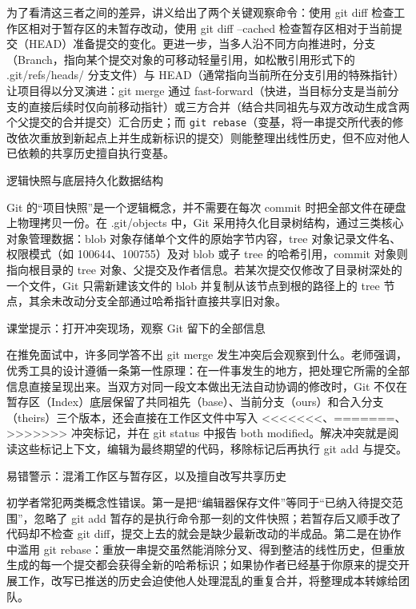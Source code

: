 \documentclass[UTF8,a4paper,11pt,fontset=fandol]{ctexart}
\begin{document}
为了看清这三者之间的差异，讲义给出了两个关键观察命令：使用 git diff 检查工作区相对于暂存区的未暂存改动，使用 git diff --cached 检查暂存区相对于当前提交（HEAD）准备提交的变化。更进一步，当多人沿不同方向推进时，分支（Branch，指向某个提交对象的可移动轻量引用，如松散引用形式下的 .git/refs/heads/ 分支文件）与 HEAD（通常指向当前所在分支引用的特殊指针）让项目得以分叉演进：git merge 通过 fast-forward（快进，当目标分支是当前分支的直接后续时仅向前移动指针）或三方合并（结合共同祖先与双方改动生成含两个父提交的合并提交）汇合历史；而 \texttt{git rebase}（变基，将一串提交所代表的修改依次重放到新起点上并生成新标识的提交）则能整理出线性历史，但不应对他人已依赖的共享历史擅自执行变基。

\begin{importantbox}{逻辑快照与底层持久化数据结构}

Git 的“项目快照”是一个逻辑概念，并不需要在每次 commit 时把全部文件在硬盘上物理拷贝一份。在 .git/objects 中，Git 采用持久化目录树结构，通过三类核心对象管理数据：blob 对象存储单个文件的原始字节内容，tree 对象记录文件名、权限模式（如 100644、100755）及对 blob 或子 tree 的哈希引用，commit 对象则指向根目录的 tree 对象、父提交及作者信息。若某次提交仅修改了目录树深处的一个文件，Git 只需新建该文件的 blob 并复制从该节点到根的路径上的 tree 节点，其余未改动分支全部通过哈希指针直接共享旧对象。

\end{importantbox}

\begin{knowledgebox}{课堂提示：打开冲突现场，观察 Git 留下的全部信息}

在推免面试中，许多同学答不出 git merge 发生冲突后会观察到什么。老师强调，优秀工具的设计遵循一条第一性原理：在一件事发生的地方，把处理它所需的全部信息直接呈现出来。当双方对同一段文本做出无法自动协调的修改时，Git 不仅在暂存区（Index）底层保留了共同祖先（base）、当前分支（ours）和合入分支（theirs）三个版本，还会直接在工作区文件中写入 <<<<<<<、=======、>>>>>>> 冲突标记，并在 git status 中报告 both modified。解决冲突就是阅读这些标记上下文，编辑为最终期望的代码，移除标记后再执行 git add 与提交。

\end{knowledgebox}

\begin{warningbox}{易错警示：混淆工作区与暂存区，以及擅自改写共享历史}

初学者常犯两类概念性错误。第一是把“编辑器保存文件”等同于“已纳入待提交范围”，忽略了 git add 暂存的是执行命令那一刻的文件快照；若暂存后又顺手改了代码却不检查 git diff，提交上去的就会是缺少最新改动的半成品。第二是在协作中滥用 git rebase：重放一串提交虽然能消除分叉、得到整洁的线性历史，但重放生成的每一个提交都会获得全新的哈希标识；如果协作者已经基于你原来的提交开展工作，改写已推送的历史会迫使他人处理混乱的重复合并，将整理成本转嫁给团队。

\end{warningbox}
\end{document}
